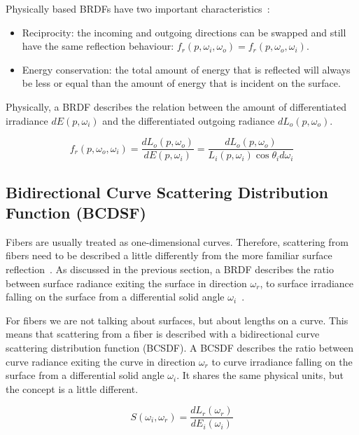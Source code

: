 \documentclass[11pt,a4paper]{report}
\begin{document}
Physically based BRDFs have two important characteristics~\cite{pbrt}:

\begin{itemize}
\item Reciprocity: the incoming and outgoing directions can be swapped and still have the same reflection behaviour: $f_r(p, \omega_i, \omega_o) = f_r(p, \omega_o, \omega_i)$.
\item Energy conservation: the total amount of energy that is reflected will always be less or equal than the amount of energy that is incident on the surface.
\end{itemize}

Physically, a BRDF describes the relation between the amount of differentiated irradiance $dE(p, \omega_i)$ and the differentiated outgoing radiance $dL_o(p, \omega_o)$. 

\begin{equation}
f_r(p, \omega_o, \omega_i) = \frac{dL_o(p, \omega_o)}{dE(p,\omega_i)} = \frac{dL_o(p, \omega_o)}{L_i(p, \omega_i) \cos \theta_i d\omega_i}
\end{equation}

\subsection{Bidirectional Curve Scattering Distribution Function (BCDSF)}

Fibers are usually treated as one-dimensional curves. Therefore, scattering from fibers need to be described a little differently from the more familiar surface reflection~\cite{ward}. As discussed in the previous section, a BRDF describes the ratio between surface radiance exiting the surface in direction $\omega_r$, to surface irradiance falling on the surface from a differential solid angle $\omega_i$~\cite{ward}.

For fibers we are not talking about surfaces, but about lengths on a curve. This means that scattering from a fiber is described with a bidirectional curve scattering distribution function (BCSDF). A BCSDF describes the ratio between curve radiance exiting the curve in direction $\omega_r$ to curve irradiance falling on the surface from a differential solid angle $\omega_i$. It shares the same physical units, but the concept is a little different.

\begin{equation}
S(\omega_i, \omega_r) = \frac{dL_r(\omega_r)}{dE_i(\omega_i)}
\end{equation}
\end{document}
